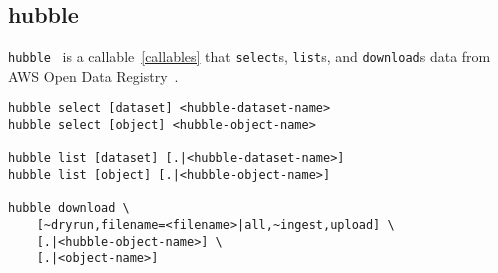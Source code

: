 \subsection{hubble}
\label{hubble}

\texttt{hubble}~ is a callable~\ref{callables} that \texttt{select}s, \texttt{list}s, and \texttt{download}s data from AWS Open Data Registry~. 
%
\begin{verbatim}
hubble select [dataset] <hubble-dataset-name>
hubble select [object] <hubble-object-name>

hubble list [dataset] [.|<hubble-dataset-name>]
hubble list [object] [.|<hubble-object-name>]

hubble download \
    [~dryrun,filename=<filename>|all,~ingest,upload] \
    [.|<hubble-object-name>] \
    [.|<object-name>]
\end{verbatim}
